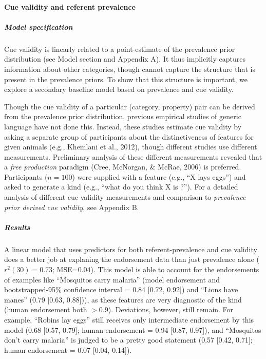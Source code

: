 \documentclass[english,floatsintext,man]{apa6}
\theoremstyle{definition}
\theoremstyle{definition}
\theoremstyle{definition}
\theoremstyle{remark}
\begin{document}
\paragraph{Cue validity and referent
prevalence}\label{cue-validity-and-referent-prevalence}

\subparagraph{Model specification}\label{model-specification}

Cue validity is linearly related to a point-estimate of the prevalence
prior distribution (see Model section and Appendix A). It thus
implicitly captures information about other categories, though cannot
capture the structure that is present in the prevalence priors. To show
that this structure is important, we explore a secondary baseline model
based on prevalence and cue validity.

Though the cue validity of a particular (category, property) pair can be
derived from the prevalence prior distribution, previous empirical
studies of generic language have not done this. Instead, these studies
estimate cue validity by asking a separate group of participants about
the distinctiveness of features for given animals (e.g., Khemlani et
al., 2012), though different studies use different measurements.
Preliminary analysis of these different measurements revealed that a
\emph{free production} paradigm (Cree, McNorgan, \& McRae, 2006) is
preferred. Participants (\(n = 100\)) were supplied with a feature
(e.g., \enquote{X lays eggs}) and asked to generate a kind (e.g.,
\enquote{what do you think X is ?}). For a detailed analysis of
different cue validity measurements and comparison to \emph{prevalence
prior derived cue validity}, see Appendix B.

\subparagraph{Results}\label{results-1}

A linear model that uses predictors for both referent-prevalence and cue
validity does a better job at explaning the endorsement data than just
prevalence alone (\(r^2(30) = 0.73\); MSE=\(0.04\)). This model is able
to account for the endorsements of examples like \enquote{Mosquitos
carry malaria} (model endorsement and bootstrapped-95\% confidence
interval = 0.84 {[}0.72, 0.92{]}) and \enquote{Lions have manes} (0.79
{[}0.63, 0.88{]})), as these features are very diagnostic of the kind
(human endorsement both \(> 0.9\)). Deviations, however, still remain.
For example, \enquote{Robins lay eggs} still receives only intermediate
endorsement by this model (0.68 {[}0.57, 0.79{]}; human endorsement =
0.94 {[}0.87, 0.97{]}), and \enquote{Mosquitos don't carry malaria} is
judged to be a pretty good statement (0.57 {[}0.42, 0.71{]}; human
endorsement = 0.07 {[}0.04, 0.14{]}).
\end{document}
